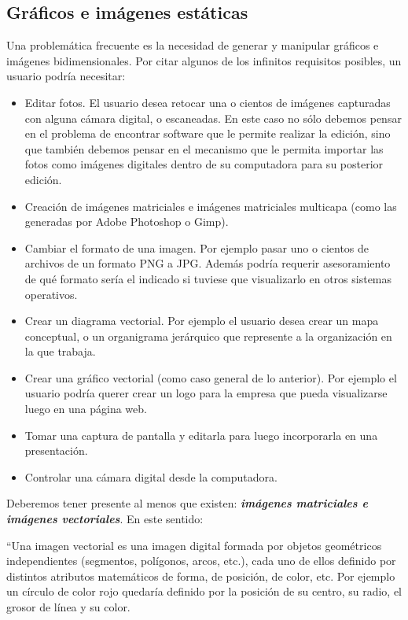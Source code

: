 \documentclass[12pt]{article}
\begin{document}
\subsection*{Gráficos e imágenes estáticas}

Una problemática frecuente es la necesidad de generar y manipular gráficos e imágenes 
bidimensionales. Por citar algunos de los infinitos requisitos posibles, un usuario 
podría necesitar: 
\begin{itemize}
	\item Editar fotos. El usuario desea retocar una o cientos de imágenes capturadas
	      con alguna cámara digital, o escaneadas. En este caso no sólo debemos pensar en el problema de 
	      encontrar software que le permite realizar la edición, sino que también debemos
	      pensar en el mecanismo que le permita importar las fotos como imágenes digitales
	      dentro de su computadora para su posterior edición.    
	\item Creación de imágenes matriciales e imágenes matriciales multicapa (como las generadas por 
	Adobe Photoshop o Gimp).  
	\item Cambiar el formato de una imagen. Por ejemplo pasar uno o cientos de archivos de 
	un formato PNG a JPG. Además podría requerir asesoramiento de qué formato sería el 
	indicado si tuviese que visualizarlo en otros sistemas operativos. 
	\item Crear un diagrama vectorial. Por ejemplo el usuario desea crear un mapa conceptual, o
	un organigrama jerárquico que represente a la organización en la que trabaja.    
	\item Crear una gráfico vectorial (como caso general de lo anterior). Por ejemplo el 
	usuario podría querer crear un logo para la empresa que pueda visualizarse luego en 
	una página web.  
	\item Tomar una captura de pantalla y editarla para luego incorporarla en una presentación. 
	\item Controlar una cámara digital desde la computadora. 
\end{itemize}

Deberemos tener presente al menos que existen: {\bf{\it imágenes matriciales e imágenes vectoriales}}. 
En este sentido:  

``Una imagen vectorial es una imagen digital formada por objetos geométricos independientes (segmentos, 
polígonos, arcos, etc.), cada uno de ellos definido por distintos atributos matemáticos de forma, de 
posición, de color, etc. Por ejemplo un círculo de color rojo quedaría definido por la posición 
de su centro, su radio, el grosor de línea y su color.
\end{document}
